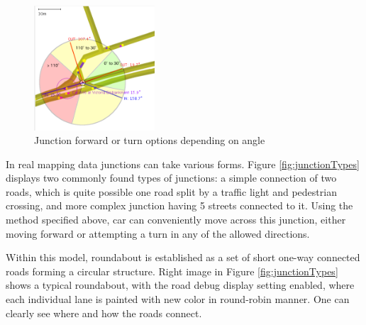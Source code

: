 \begin{figure}[H]
    \vspace{1.5em}
    \caption{Junction forward or turn options depending on angle }
    \label{fig:forwardOrTurnOption}
    \centering
    \includegraphics[width=0.4\textwidth]{figs/junction/junction_car_incoming_angle_with_turn_sectors.png}
    \vspace{1.5em}
\end{figure}

In real mapping data junctions can take various forms. Figure \ref{fig:junctionTypes} displays two commonly found types of junctions: a simple connection of two roads, which is quite possible one road split by a traffic light and pedestrian crossing, and more complex junction having 5 streets connected to it. Using the method specified above, car can conveniently move across this junction, either moving forward or attempting a turn in any of the allowed directions.

Within this model, roundabout is established as a set of short one-way connected roads forming a circular structure. Right image in Figure \ref{fig:junctionTypes} shows a typical roundabout, with the road debug display setting enabled, where each individual lane is painted with new color in round-robin manner. One can clearly see where and how the roads connect.


